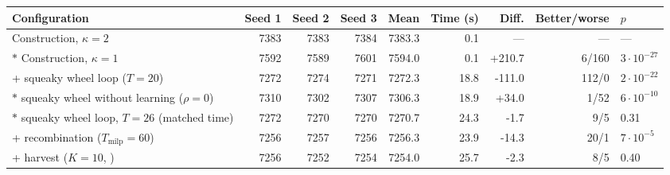 \begin{tabular}{@{}lrrrrrrrl@{}}
\toprule
Configuration & Seed 1 & Seed 2 & Seed 3 & Mean & Time (s) & Diff. & Better/worse & $p$\\
\midrule
Construction, $\kappa=2$ & 7383 & 7383 & 7384 & 7383.3 & 0.1 & --- & --- & ---\\
$\ast$ Construction, $\kappa=1$ & 7592 & 7589 & 7601 & 7594.0 & 0.1 & +210.7 & 6/160 & $3\cdot 10^{-27}$\\
+ squeaky wheel loop ($T=20$) & 7272 & 7274 & 7271 & 7272.3 & 18.8 & -111.0 & 112/0 & $2\cdot 10^{-22}$\\
$\ast$ squeaky wheel without learning ($\rho=0$) & 7310 & 7302 & 7307 & 7306.3 & 18.9 & +34.0 & 1/52 & $6\cdot 10^{-10}$\\
$\ast$ squeaky wheel loop, $T=26$ (matched time) & 7272 & 7270 & 7270 & 7270.7 & 24.3 & -1.7 & 9/5 & 0.31\\
+ recombination ($T_{\mathrm{milp}}=60$) & 7256 & 7257 & 7256 & 7256.3 & 23.9 & -14.3 & 20/1 & $7\cdot 10^{-5}$\\
+ harvest ($K=10$, \cfgbal{}) & 7256 & 7252 & 7254 & 7254.0 & 25.7 & -2.3 & 8/5 & 0.40\\
\bottomrule
\end{tabular}
